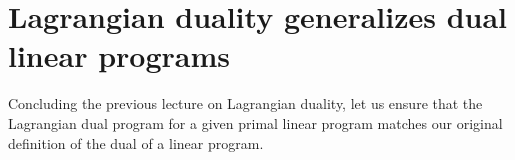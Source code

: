 \documentclass[11pt]{article}
\newcommand{\0}{\mathbf{0}}
\newcommand{\1}{\mathbf{1}}
\begin{document}

%

%

\section{Lagrangian duality generalizes dual linear programs}

Concluding the previous lecture on Lagrangian duality, let us ensure that the Lagrangian dual program for a given primal linear program matches our original definition of the dual of a linear program.
\end{document}
